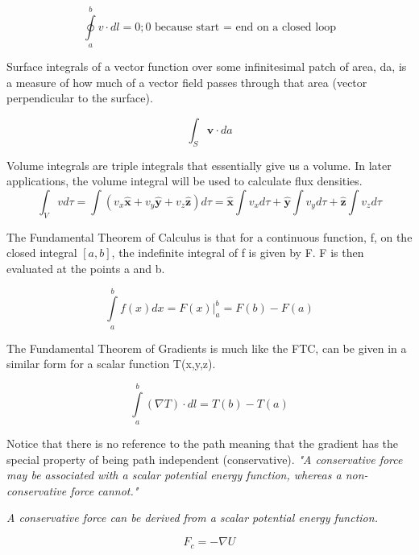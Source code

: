 \begin{equation}
\oint\limits_{a}^{b} v \cdot dl = 0; \text{0 because start = end on a closed loop}
\end{equation}

Surface integrals of a vector function over some infinitesimal patch of area, da, is a measure of how much of a vector field passes through that area (vector perpendicular to the surface). 


\begin{equation}
\int_S \mathbf{v} \cdot da
\end{equation}


Volume integrals are triple integrals that essentially give us a volume. In later applications, the volume integral will be used to calculate flux densities.
\begin{equation}
\int_V v d\tau = \int(v_x\mathbf{\hat{x}}+v_y\mathbf{\hat{y}}+v_z\mathbf{\hat{z}})d\tau =\boxed{\mathbf{\hat{x}}\int v_x d\tau + \mathbf{\hat{y}}\int v_y d\tau  + \mathbf{\hat{z}}\int v_z d\tau }
\end{equation}

\newpage


The Fundamental Theorem of Calculus is that for a continuous function, f, on the closed integral \( [a,b] \), the indefinite integral of f is given by F. F is then evaluated at the points a and b.


\begin{equation}
\int\limits_{a}^{b} f(x)dx = F(x)\vert_{a}^{b}=F(b) - F(a)
\end{equation}

The Fundamental Theorem of Gradients is much like the FTC, can be given in a similar form for a scalar function T(x,y,z).

\begin{equation}
\int\limits_{a}^{b} (\nabla{T})\cdot dl =T(b) - T(a)
\end{equation}

Notice that there is no reference to the path meaning that the gradient has the special property of being path independent (conservative).  \emph{"A conservative force may be associated with a scalar potential energy function, whereas a non-conservative force cannot."}
\smallskip

\emph{A conservative force can be derived from a scalar potential energy function.}


\begin{equation}
F_c = -\nabla{U}
\end{equation}

